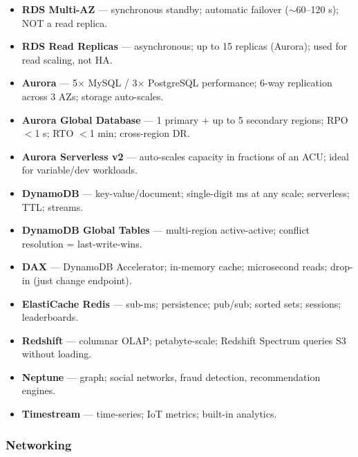 \begin{keyfacts}
\begin{itemize}
  \item \textbf{RDS Multi-AZ} --- synchronous standby; automatic failover ($\sim$60--120 s); NOT a read replica.
  \item \textbf{RDS Read Replicas} --- asynchronous; up to 15 replicas (Aurora); used for read scaling, not HA.
  \item \textbf{Aurora} --- 5$\times$ MySQL / 3$\times$ PostgreSQL performance; 6-way replication across 3 AZs; storage auto-scales.
  \item \textbf{Aurora Global Database} --- 1 primary + up to 5 secondary regions; RPO $<$1 s; RTO $<$1 min; cross-region DR.
  \item \textbf{Aurora Serverless v2} --- auto-scales capacity in fractions of an ACU; ideal for variable/dev workloads.
  \item \textbf{DynamoDB} --- key-value/document; single-digit ms at any scale; serverless; TTL; streams.
  \item \textbf{DynamoDB Global Tables} --- multi-region active-active; conflict resolution = last-write-wins.
  \item \textbf{DAX} --- DynamoDB Accelerator; in-memory cache; microsecond reads; drop-in (just change endpoint).
  \item \textbf{ElastiCache Redis} --- sub-ms; persistence; pub/sub; sorted sets; sessions; leaderboards.
  \item \textbf{Redshift} --- columnar OLAP; petabyte-scale; Redshift Spectrum queries S3 without loading.
  \item \textbf{Neptune} --- graph; social networks, fraud detection, recommendation engines.
  \item \textbf{Timestream} --- time-series; IoT metrics; built-in analytics.
\end{itemize}
\end{keyfacts}

\subsubsection{Networking}

